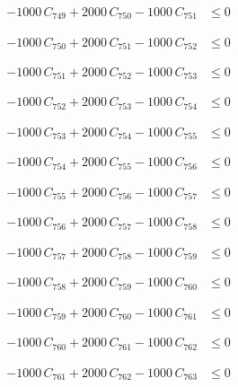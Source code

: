 \documentclass[a4paper,11pt]{article}
\begin{document}
\begin{align}
-1000\,C_{749} + 2000\,C_{750} - 1000\,C_{751} &\leq 0 \nonumber
\end{align}

\begin{align}
-1000\,C_{750} + 2000\,C_{751} - 1000\,C_{752} &\leq 0 \nonumber
\end{align}

\begin{align}
-1000\,C_{751} + 2000\,C_{752} - 1000\,C_{753} &\leq 0 \nonumber
\end{align}

\begin{align}
-1000\,C_{752} + 2000\,C_{753} - 1000\,C_{754} &\leq 0 \nonumber
\end{align}

\begin{align}
-1000\,C_{753} + 2000\,C_{754} - 1000\,C_{755} &\leq 0 \nonumber
\end{align}

\begin{align}
-1000\,C_{754} + 2000\,C_{755} - 1000\,C_{756} &\leq 0 \nonumber
\end{align}

\begin{align}
-1000\,C_{755} + 2000\,C_{756} - 1000\,C_{757} &\leq 0 \nonumber
\end{align}

\begin{align}
-1000\,C_{756} + 2000\,C_{757} - 1000\,C_{758} &\leq 0 \nonumber
\end{align}

\begin{align}
-1000\,C_{757} + 2000\,C_{758} - 1000\,C_{759} &\leq 0 \nonumber
\end{align}

\begin{align}
-1000\,C_{758} + 2000\,C_{759} - 1000\,C_{760} &\leq 0 \nonumber
\end{align}

\begin{align}
-1000\,C_{759} + 2000\,C_{760} - 1000\,C_{761} &\leq 0 \nonumber
\end{align}

\begin{align}
-1000\,C_{760} + 2000\,C_{761} - 1000\,C_{762} &\leq 0 \nonumber
\end{align}

\begin{align}
-1000\,C_{761} + 2000\,C_{762} - 1000\,C_{763} &\leq 0 \nonumber
\end{align}
\end{document}

